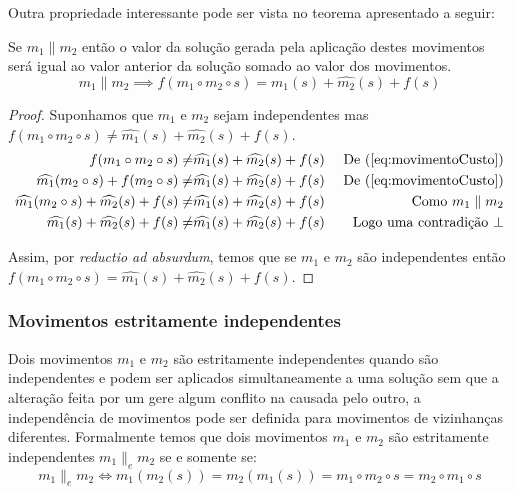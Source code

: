 Outra propriedade interessante pode ser vista no teorema apresentado a seguir:
\begin{theorem}\label{teo:independenciaMovimentos2a2}
Se $m_1 \parallel m_2$ então o valor da solução gerada pela aplicação destes movimentos será igual ao valor anterior da solução somado ao valor dos movimentos.
\begin{equation}
\label{eq:movimentoCustoSomaDois}
m_1 \parallel m_2 \implies f(m_1 \circ m_2 \circ s) = \widehat{m_1}(s) + \widehat{m_2}(s) + f(s)
\end{equation}
\begin{proof}
    Suponhamos que $m_1$ e $m_2$ sejam independentes mas $f(m_1 \circ m_2 \circ s) \neq \widehat{m_1}(s) + \widehat{m_2}(s) + f(s)$.
    \begin{align*}
        f(m_1 \circ m_2 \circ s) \neq & \widehat{m_1}(s) + \widehat{m_2}(s) + f(s) & \textrm{ De } (\ref{eq:movimentoCusto}) \\
        \widehat{m_1}(m_2 \circ s) + f(m_2 \circ s) \neq & \widehat{m_1}(s) + \widehat{m_2}(s) + f(s) & \textrm{ De } (\ref{eq:movimentoCusto}) \\
        \widehat{m_1}(m_2 \circ s) + \widehat{m_2}(s) + f(s) \neq & \widehat{m_1}(s) + \widehat{m_2}(s) + f(s) & \textrm{ Como } m_1 \parallel m_2 \\
        \widehat{m_1}(s) + \widehat{m_2}(s) + f(s) \neq & \widehat{m_1}(s) + \widehat{m_2}(s) + f(s) & \textrm{ Logo uma contradição } \bot
    \end{align*}
    
    Assim, por \textit{reductio ad absurdum}, temos que se $m_1$ e $m_2$ são independentes então $f(m_1 \circ m_2 \circ s) = \widehat{m_1}(s) + \widehat{m_2}(s) + f(s)$.
\end{proof}
\end{theorem}

\subsubsection{Movimentos estritamente independentes} \label{subsubsec:movimentosEstritamenteIndependentes}

Dois movimentos $m_1$ e $m_2$ são estritamente independentes quando são independentes e podem ser aplicados simultaneamente a uma solução sem que a alteração feita por um gere algum conflito na causada pelo outro, a independência de movimentos pode ser definida para movimentos de vizinhanças diferentes.
Formalmente temos que dois movimentos $m_1$ e $m_2$ são estritamente independentes $m_1 \parallel_e m_2$ se e somente se:
\begin{equation}  \label{eq:movimentosIndependentes}
m_1 \parallel_e m_2 \iff m_1(m_2(s)) = m_2(m_1(s)) = m_1 \circ m_2 \circ s = m_2 \circ m_1 \circ s
\end{equation}

